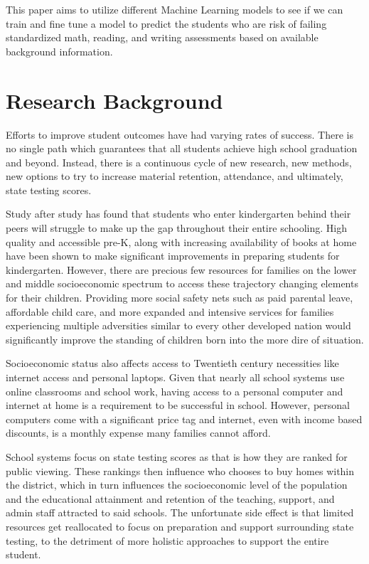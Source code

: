 \documentclass[doc]{apa6} %
\begin{document}
This paper aims to utilize different Machine Learning models to see if we can train and fine tune a model to predict the students who are risk of failing standardized math, reading, and writing assessments based on available background information.

\section{Research Background}
Efforts to improve student outcomes have had varying rates of success. There is no single path which guarantees that all students achieve high school graduation and beyond.  Instead, there is a continuous cycle of new research, new methods, new options to try to increase material retention, attendance, and ultimately, state testing scores.

Study after study has found that students who enter kindergarten behind their peers will struggle to make up the gap throughout their entire schooling. \cite{EdInequities} \cite{sesbehind1} \cite{sesbehind2} \cite{sesbehind3}  High quality and accessible pre-K, along with increasing availability of books at home have been shown to make significant improvements in preparing students for kindergarten. However, there are precious few resources for families on the lower and middle socioeconomic spectrum to access these trajectory changing elements for their children. \cite{cradleK} Providing more social safety nets such as paid parental leave, affordable child care, and more expanded and intensive services for families experiencing multiple adversities similar to every other developed nation would significantly improve the standing of children born into the more dire of situation.

Socioeconomic status also affects access to Twentieth century necessities like internet access and personal laptops. Given that nearly all school systems use online classrooms and school work, having access to a personal computer and internet at home is a requirement to be successful in school. However, personal computers come with a significant price tag and internet, even with income based discounts, is a monthly expense many families cannot afford.\cite{sesinternet} 

School systems focus on state testing scores as that is how they are ranked for public viewing. \cite{linnetal} These rankings then influence who chooses to buy homes within the district, which in turn influences the socioeconomic level of the population and the educational attainment and retention of the teaching, support, and admin staff attracted to said schools. The unfortunate side effect is that limited resources get reallocated to focus on preparation and support surrounding state testing, to the detriment of more holistic approaches to support the entire student. \cite{cradle}
\end{document}
